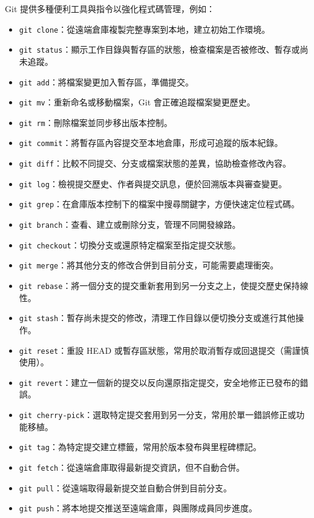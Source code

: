 \documentclass[a4paper,12pt]{article}
\begin{document}
Git 提供多種便利工具與指令以強化程式碼管理，例如：
\begin{itemize}
  \item \verb|git clone|：從遠端倉庫複製完整專案到本地，建立初始工作環境。
  \item \verb|git status|：顯示工作目錄與暫存區的狀態，檢查檔案是否被修改、暫存或尚未追蹤。
  \item \verb|git add|：將檔案變更加入暫存區，準備提交。
  \item \verb|git mv|：重新命名或移動檔案，Git 會正確追蹤檔案變更歷史。
  \item \verb|git rm|：刪除檔案並同步移出版本控制。
  \item \verb|git commit|：將暫存區內容提交至本地倉庫，形成可追蹤的版本紀錄。
  \item \verb|git diff|：比較不同提交、分支或檔案狀態的差異，協助檢查修改內容。
  \item \verb|git log|：檢視提交歷史、作者與提交訊息，便於回溯版本與審查變更。
  \item \verb|git grep|：在倉庫版本控制下的檔案中搜尋關鍵字，方便快速定位程式碼。
  \item \verb|git branch|：查看、建立或刪除分支，管理不同開發線路。
  \item \verb|git checkout|：切換分支或還原特定檔案至指定提交狀態。
  \item \verb|git merge|：將其他分支的修改合併到目前分支，可能需要處理衝突。
  \item \verb|git rebase|：將一個分支的提交重新套用到另一分支之上，使提交歷史保持線性。
  \item \verb|git stash|：暫存尚未提交的修改，清理工作目錄以便切換分支或進行其他操作。
  \item \verb|git reset|：重設 HEAD 或暫存區狀態，常用於取消暫存或回退提交（需謹慎使用）。
  \item \verb|git revert|：建立一個新的提交以反向還原指定提交，安全地修正已發布的錯誤。
  \item \verb|git cherry-pick|：選取特定提交套用到另一分支，常用於單一錯誤修正或功能移植。
  \item \verb|git tag|：為特定提交建立標籤，常用於版本發布與里程碑標記。
  \item \verb|git fetch|：從遠端倉庫取得最新提交資訊，但不自動合併。
  \item \verb|git pull|：從遠端取得最新提交並自動合併到目前分支。
  \item \verb|git push|：將本地提交推送至遠端倉庫，與團隊成員同步進度。
\end{itemize}
\end{document}

